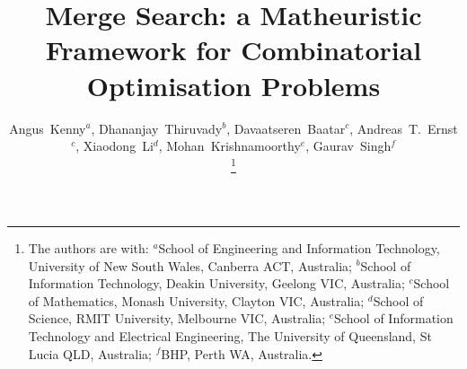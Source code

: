 \documentclass[journal]{IEEEtran}
\begin{document}
%
\title{Merge Search: a Matheuristic Framework for Combinatorial Optimisation Problems}
%
%
%

\author{Angus~Kenny$^a$, Dhananjay~Thiruvady$^b$, Davaatseren~Baatar$^c$, Andreas~T.~Ernst$^c$, Xiaodong~Li$^d$, Mohan~Krishnamoorthy$^e$, Gaurav~Singh$^f$%

\thanks{The authors are with: $^a$School of Engineering and Information Technology, University of New South Wales, Canberra ACT, Australia; $^b$School of Information Technology, Deakin University, Geelong VIC, Australia; $^c$School of Mathematics, Monash University, Clayton VIC, Australia; $^d$School of Science, RMIT University, Melbourne VIC, Australia; $^e$School of Information Technology and Electrical Engineering, The University of Queensland, St Lucia QLD, Australia; $^f$BHP, Perth WA, Australia.}}

% 
%
\end{document}
